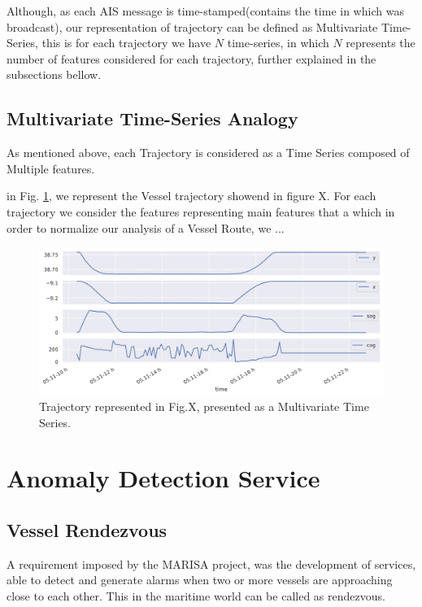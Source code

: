 Although, as each AIS message is time-stamped(contains the time in which was broadcast), our representation of trajectory can be defined as Multivariate Time-Series, this is for each trajectory we have $N$ time-series, in which $N$ represents the number of features considered for each trajectory, further explained in the subsections bellow.

\subsection{Multivariate Time-Series Analogy}
As mentioned above, each Trajectory is considered as a Time Series composed of Multiple features.  

in Fig. \ref{fig: MTimeSeries_example}, we represent the Vessel trajectory showend in figure X. 
For each trajectory we consider the features representing 
main features that a which in order to normalize our analysis of a Vessel Route, we ...

\begin{figure}[H]
	\centering
	\includegraphics[scale = .5]{figures/Ch3/ts_example.png}
    \caption{Trajectory represented in Fig.X, presented as a Multivariate Time Series.}
    \label{fig: MTimeSeries_example}
\end{figure}



\section{Anomaly Detection Service}
\subsection{Vessel Rendezvous}
A requirement imposed by the MARISA project, was the development of services, able to detect and generate alarms when two or more vessels are approaching close to each other. This in the maritime world can be called as rendezvous.


